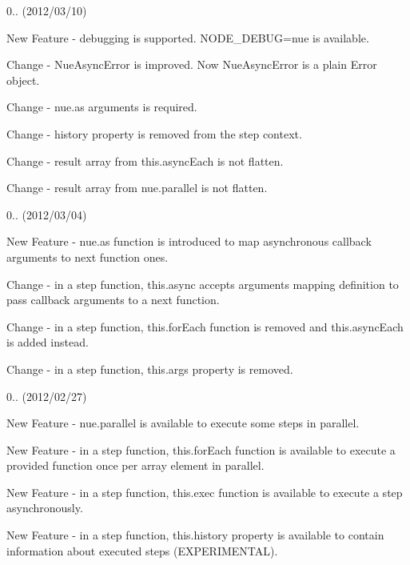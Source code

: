 
\begin{DoxyItemize}
\item 0.. (2012/03/10)
\begin{DoxyItemize}
\item New Feature -\/ debugging is supported. {\ttfamily N\+O\+D\+E\+\_\+\+D\+E\+B\+U\+G=nue} is available.
\item Change -\/ Nue\+Async\+Error is improved. Now Nue\+Async\+Error is a plain Error object.
\item Change -\/ {\ttfamily nue.\+as} arguments is required.
\item Change -\/ {\ttfamily history} property is removed from the step context.
\item Change -\/ result array from {\ttfamily this.\+async\+Each} is not flatten.
\item Change -\/ result array from {\ttfamily nue.\+parallel} is not flatten.
\end{DoxyItemize}
\item 0.. (2012/03/04)
\begin{DoxyItemize}
\item New Feature -\/ {\ttfamily nue.\+as} function is introduced to map asynchronous callback arguments to next function ones.
\item Change -\/ in a step function, {\ttfamily this.\+async} accepts arguments mapping definition to pass callback arguments to a next function.
\item Change -\/ in a step function, {\ttfamily this.\+for\+Each} function is removed and {\ttfamily this.\+async\+Each} is added instead.
\item Change -\/ in a step function, {\ttfamily this.\+args} property is removed.
\end{DoxyItemize}
\item 0.. (2012/02/27)
\begin{DoxyItemize}
\item New Feature -\/ {\ttfamily nue.\+parallel} is available to execute some steps in parallel.
\item New Feature -\/ in a step function, {\ttfamily this.\+for\+Each} function is available to execute a provided function once per array element in parallel.
\item New Feature -\/ in a step function, {\ttfamily this.\+exec} function is available to execute a step asynchronously.
\item New Feature -\/ in a step function, {\ttfamily this.\+history} property is available to contain information about executed steps (E\+X\+P\+E\+R\+I\+M\+E\+N\+T\+A\+L).

\end{DoxyItemize}
\end{DoxyItemize}
